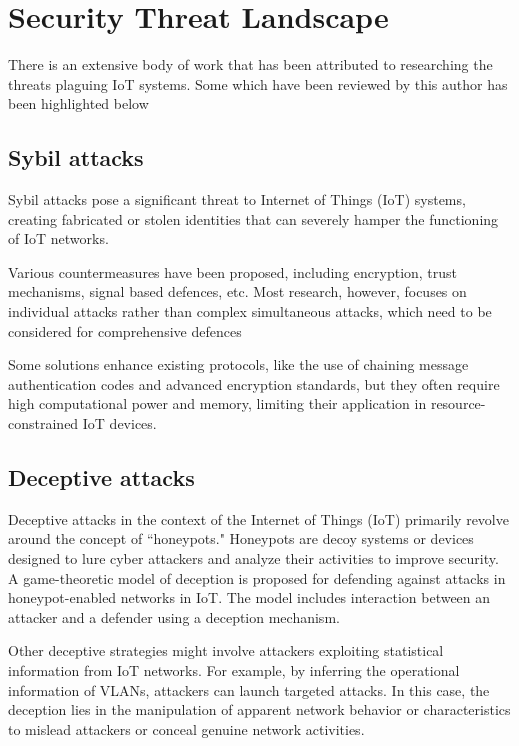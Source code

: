 
\section{Security Threat Landscape}
\label{sec:security_threat_landscape}
There is an extensive body of work that has been attributed to researching the threats plaguing IoT systems. Some which have been reviewed by this author has been highlighted below


\subsection{Sybil attacks}
Sybil attacks pose a significant threat to Internet of Things (IoT) systems, creating fabricated or stolen identities that can severely hamper the functioning of IoT networks\cite{rajan2017sybil}.

Various countermeasures have been proposed, including encryption, trust mechanisms, signal based defences, etc. Most research, however, focuses on individual attacks rather than complex simultaneous attacks, which need to be considered for comprehensive defences\cite{zhang2014sybil}

Some solutions enhance existing protocols, like the use of chaining message authentication codes and advanced encryption standards, but they often require high computational power and memory, limiting their application in resource-constrained IoT devices\cite{al2021ddos}.

\subsection{Deceptive attacks}
Deceptive attacks in the context of the Internet of Things (IoT) primarily revolve around the concept of ``honeypots." Honeypots are decoy systems or devices designed to lure cyber attackers and analyze their activities to improve security\cite{la2016deceptive}. A game-theoretic model of deception is proposed for defending against attacks in honeypot-enabled networks in IoT. The model includes interaction between an attacker and a defender using a deception mechanism\cite{la2016deceptive}.

Other deceptive strategies might involve attackers exploiting statistical information from IoT networks. For example, by inferring the operational information of VLANs, attackers can launch targeted attacks\cite{yang2022differential}. In this case, the deception lies in the manipulation of apparent network behavior or characteristics to mislead attackers or conceal genuine network activities.

